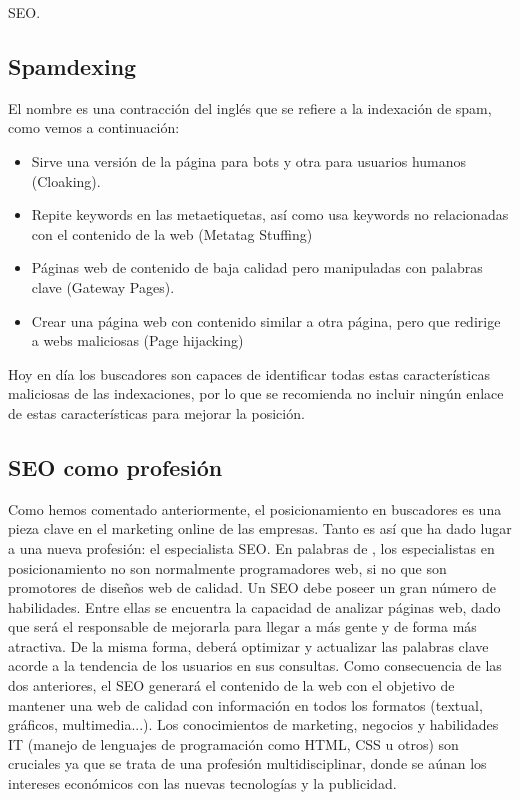 \begin{section}{SEO.}
		\subsection{Spamdexing}
		El nombre es una contracción del inglés que se refiere a la indexación de spam, como vemos a continuación:
		\begin{itemize}
			\item Sirve una versión de la página para bots y otra para usuarios humanos (Cloaking).
			\item Repite keywords en las metaetiquetas, así como usa keywords no relacionadas con el contenido de la web (Metatag Stuffing)
			\item Páginas web de contenido de baja calidad pero manipuladas con palabras clave (Gateway Pages).
			\item Crear una página web con contenido similar a otra página, pero que redirige a webs maliciosas (Page hijacking)
		\end{itemize}
		
		Hoy en día los buscadores son capaces de identificar todas estas características maliciosas de las indexaciones, por lo que se recomienda no incluir ningún enlace de estas características para mejorar la posición.
	\end{section}
	
	\subsection{SEO como profesión}

		Como hemos comentado anteriormente, el posicionamiento en buscadores es una pieza clave en el marketing online de las empresas. Tanto es así que ha dado lugar a una nueva profesión: el especialista SEO. En palabras de \cite{seo-prof}, los especialistas en posicionamiento no son normalmente programadores web, si no que son promotores de diseños web de calidad. Un SEO debe poseer un gran número de habilidades. Entre ellas se encuentra la capacidad de analizar páginas web, dado que será el responsable de mejorarla para llegar a más gente y de forma más atractiva. De la misma forma, deberá optimizar y actualizar las palabras clave acorde a la tendencia de los usuarios en sus consultas. Como consecuencia de las dos anteriores, el SEO generará el contenido de la web con el objetivo de mantener una web de calidad con información en todos los formatos (textual, gráficos, multimedia...). Los conocimientos de marketing, negocios y habilidades IT (manejo de lenguajes de programación como HTML, CSS u otros) son cruciales ya que se trata de una profesión multidisciplinar, donde se aúnan los intereses económicos con las nuevas tecnologías y la publicidad.

